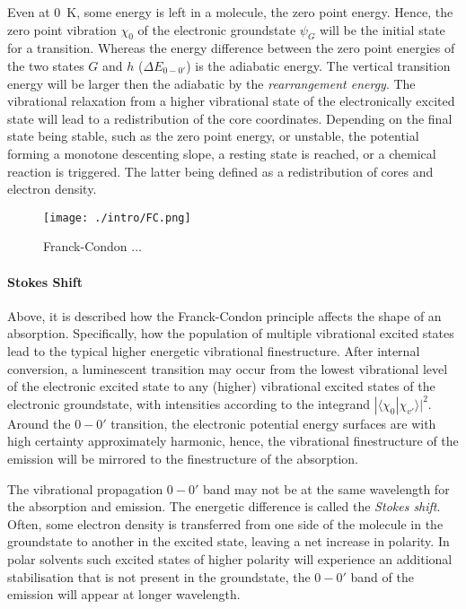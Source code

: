 			Even at \qty{0}{\K}, some energy is left in a molecule, the zero point energy. Hence, the zero point vibration $\chi_0$ of the electronic groundstate $\psi_G$ will be the initial state for a transition. Whereas the energy difference between the zero point energies of the two states $G$ and $h$ ($\Delta E_{0-0'} $) is the adiabatic energy. The vertical transition energy will be larger then the adiabatic by the \emph{rearrangement energy}. The vibrational relaxation from a higher vibrational state of the electronically excited state will lead to a redistribution of the core coordinates. Depending on the final state being stable, such as the zero point energy, or unstable, the potential forming a monotone descenting slope, a resting state is reached, or a chemical reaction is triggered. The latter being defined as a redistribution of cores and electron density.

			\begin{figure}[h]
				\centering
				\label{fig:FC}
				\texttt{[image: ./intro/FC.png]}
				\caption{Franck-Condon ...}
			\end{figure}

			\paragraph{Stokes Shift}
			Above, it is described how the Franck-Condon principle affects the shape of an absorption. Specifically, how the population of multiple vibrational excited states lead to the typical higher energetic vibrational finestructure. After internal conversion, a luminescent transition may occur from the lowest vibrational level of the electronic excited state to any (higher) vibrational excited states of the electronic groundstate, with intensities according to the integrand $|\langle\chi_0|\chi_{v'}\rangle|^2$. Around the $0-0'$ transition, the electronic potential energy surfaces are with high certainty approximately harmonic, hence, the vibrational finestructure of the emission will be mirrored to the finestructure of the absorption.  

			The vibrational propagation $0-0'$ band may not be at the same wavelength for the absorption and emission. The energetic difference is called the \emph{Stokes shift}. Often, some electron density is transferred from one side of the molecule in the groundstate to another in the excited state, leaving a net increase in polarity. In polar solvents such excited states of higher polarity will experience an additional stabilisation that is not present in the groundstate, the $0-0'$ band of the emission will appear at longer wavelength.  

